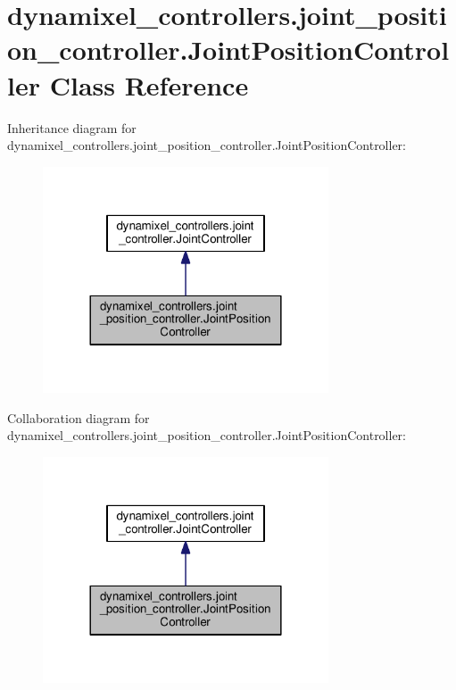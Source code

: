 \hypertarget{classdynamixel__controllers_1_1joint__position__controller_1_1_joint_position_controller}{}\section{dynamixel\+\_\+controllers.\+joint\+\_\+position\+\_\+controller.\+Joint\+Position\+Controller Class Reference}
\label{classdynamixel__controllers_1_1joint__position__controller_1_1_joint_position_controller}


Inheritance diagram for dynamixel\+\_\+controllers.\+joint\+\_\+position\+\_\+controller.\+Joint\+Position\+Controller\+:
\nopagebreak
\begin{figure}[H]
\begin{center}
\leavevmode
\includegraphics[width=240pt]{d1/da8/classdynamixel__controllers_1_1joint__position__controller_1_1_joint_position_controller__inherit__graph}
\end{center}
\end{figure}


Collaboration diagram for dynamixel\+\_\+controllers.\+joint\+\_\+position\+\_\+controller.\+Joint\+Position\+Controller\+:
\nopagebreak
\begin{figure}[H]
\begin{center}
\leavevmode
\includegraphics[width=240pt]{d0/d82/classdynamixel__controllers_1_1joint__position__controller_1_1_joint_position_controller__coll__graph}
\end{center}
\end{figure}
